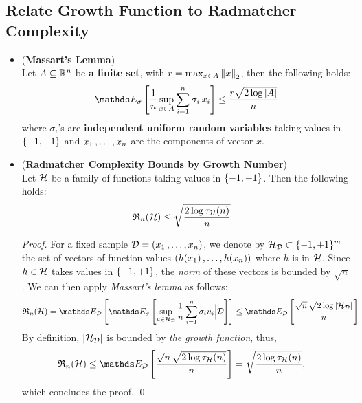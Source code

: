 \documentclass[11pt]{article}
\begin{document}
\subsection{Relate Growth Function to Radmatcher Complexity}
\begin{itemize}
\item \begin{lemma}(\textbf{Massart's Lemma}) \citep{mohri2018foundations}\\
Let $A \subseteq {\mathbb R}^n$ be \textbf{a finite set}, with $r = \max_{x \in A}\left\|x\right\|_{2}$, then the following holds:
\begin{align}
\E{\sigma}{\frac{1}{n}\sup_{x \in A}\sum_{i=1}^{n}\sigma_i\,x_i} \le \frac{r\sqrt{2 \log\abs{A}}}{n} \label{eqn: massart_lemma}
\end{align}
where $\sigma_i$'s are \textbf{independent uniform random variables} taking values in $\left\{-1, +1\right\}$ and $x_1 \,{,}\ldots{,}\, x_n$ are the components of vector $x$.
\end{lemma}

\item \begin{corollary} \label{cor: radmatcher_growth} (\textbf{Radmatcher Complexity Bounds by Growth Number}) \citep{mohri2018foundations}\\
Let ${\mathcal H}$ be a family of functions taking values in $\left\{-1, +1\right\}$. Then the following holds:
\begin{align}
{\mathfrak R}_{n}({\mathcal H}) &\le \sqrt{\frac{2 \log \tau_{{\mathcal H}}(n)}{n}} \label{eqn: growth_number_radmatcher_comp}
\end{align}
\end{corollary}
\begin{proof}
For a fixed sample ${\mathcal D} = (x_1 \,{,}\ldots{,}\, x_n)$, we denote by ${\mathcal H}_{{\mathcal D}} \subset \{-1, +1\}^{m}$ the set of vectors of function values $(h(x_1) \,{,}\ldots{,}\, h(x_n))$ where $h$ is in ${\mathcal H}$. Since $h\in {\mathcal H}$ takes values in $\left\{-1, +1\right\}$, the \emph{norm} of these vectors is bounded by $\sqrt{n}$. We can then apply
\emph{Massart's lemma} as follows:
\begin{align*}
\frR_{n}(\cH) &= \E{\cD}{\E{\sigma}{\sup_{u \in \cH_{\cD}}\frac{1}{n}\sum_{i=1}^{n}\sigma_i u_i \Big| \cD}} \le  \E{\cD}{\frac{\sqrt{n}\,\sqrt{2 \log\abs{\cH_{\cD}}}}{n}}
\end{align*}
By definition, $\left\lvert {\mathcal H}_{{\mathcal D}} \right\rvert$ is bounded by \emph{the growth function}, thus,
\begin{align*}
\frR_{n}(\cH)  &\le  \E{\cD}{\frac{\sqrt{n}\,\sqrt{2 \log \tau_{\cH}(n)}}{n}} = \sqrt{\frac{2 \log \tau_{\cH}(n)}{n}},
\end{align*}
which concludes the proof. \qed
\end{proof}
\end{itemize}
\end{document}
